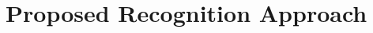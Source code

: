 \documentclass[conference]{IEEEtran}
\begin{document}
\section{Proposed Recognition Approach}

\end{document}
